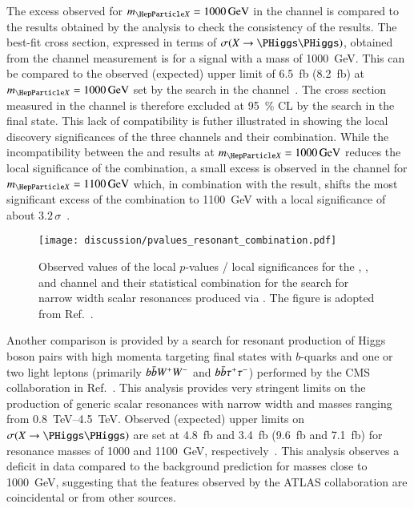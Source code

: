 The excess observed for $\mX = \SI{1000}{\GeV}$ in the \bbtautau
channel is compared to the results obtained by the \bbbb analysis to
check the consistency of the results. The best-fit cross section,
expressed in terms of $\sigma(X \to \HH)$, obtained from the \bbtautau
channel measurement is  for a
signal with a mass of \SI{1000}{\GeV}. This can be compared to the
observed (expected) upper limit of \SI{6.5}{\femto\barn}
(\SI{8.2}{\femto\barn}) at $\mX = \SI{1000}{\GeV}$ set by the search
in the \bbbb channel~\cite{HDBS-2018-41,hepdata.111124}. The cross
section measured in the \bbtautau channel is therefore excluded at
\SI{95}{\percent} CL by the search in the \bbbb final state. This lack
of compatibility is futher illustrated in
 showing the local discovery
significances of the three channels and their combination. While the
incompatibility between the \bbtautau and \bbbb results at
$\mX = \SI{1000}{\GeV}$ reduces the local significance of the
combination, a small excess is observed in the \bbbb channel for
$\mX = \SI{1100}{\GeV}$ which, in combination with the \bbtautau
result, shifts the most significant excess of the combination to
\SI{1100}{\GeV} with a local significance of about
$3.2\,\sigma$~\cite{ATLAS-CONF-2021-052}.


\begin{figure}[htbp]
  \centering

  \texttt{[image: discussion/pvalues\_resonant\_combination.pdf]}

  \caption{Observed values of the local $p$-values / local
    significances for the \bbbb, \bbtautau, and \bbyy channel and
    their statistical combination for the search for narrow width
    scalar resonances produced via \ggF. The figure is adopted from
    Ref.~\cite{ATLAS-CONF-2021-052}.}
  \label{fig:resonant_hh_comb_pvalues}
\end{figure}

Another comparison is provided by a search for resonant production of
Higgs boson pairs with high momenta targeting final states with
$b$-quarks and one or two light leptons (primarily $b\bar{b} W^+ W^-$
and $b\bar{b} \tau^+ \tau^-$) performed by the CMS collaboration in
Ref.~\cite{CMS-B2G-20-007}. This analysis provides very stringent
limits on the production of generic scalar resonances with narrow
width and masses ranging from \SIrange{0.8}{4.5}{\TeV}. Observed
(expected) upper limits on $\sigma(X \to \HH)$ are set at
\SI{4.8}{\femto\barn} and \SI{3.4}{\femto\barn} (\SI{9.6}{\femto\barn}
and \SI{7.1}{\femto\barn}) for resonance masses of \num{1000} and
\SI{1100}{\GeV},
respectively~\cite{CMS-B2G-20-007,hepdata.115024}. This analysis
observes a deficit in data compared to the background prediction for
masses close to \SI{1000}{\GeV}, suggesting that the features observed
by the ATLAS collaboration are coincidental or from other sources.

